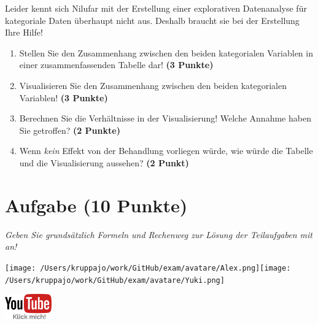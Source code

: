 \documentclass[a4paper, 9pt]{scrartcl}\usepackage[]{graphicx}\usepackage[]{xcolor}
\begin{document}
\vspace{2Ex}

Leider kennt sich Nilufar mit der Erstellung einer explorativen Datenanalyse für kategoriale Daten überhaupt nicht aus. Deshalb braucht sie bei der Erstellung Ihre Hilfe!

\begin{enumerate}
\item Stellen Sie den Zusammenhang zwischen den beiden kategorialen Variablen in einer zusammenfassenden Tabelle dar! \textbf{(3 Punkte)}
\item Visualisieren Sie den Zusammenhang zwischen den beiden kategorialen Variablen! \textbf{(3 Punkte)}
\item Berechnen Sie die Verhältnisse in der Visualisierung! Welche Annahme haben Sie getroffen? \textbf{(2 Punkte)}
\item Wenn \textit{kein} Effekt von der Behandlung vorliegen würde, wie würde die Tabelle und die Visualisierung aussehen? \textbf{(2 Punkt)}
\end{enumerate} 
\clearpage

\section{Aufgabe \hfill (10 Punkte)}

\textit{Geben Sie grundsätzlich Formeln und Rechenweg zur Lösung der Teilaufgaben mit an!} \\[1Ex]
 

 
\begin{minipage}[t]{0.5\textwidth}
\texttt{[image: /Users/kruppajo/work/GitHub/exam/avatare/Alex.png]}\hspace{-4mm}\texttt{[image: /Users/kruppajo/work/GitHub/exam/avatare/Yuki.png]}
\end{minipage}
\begin{minipage}[t]{0.5\textwidth}
\hfill
\href{https://youtu.be/Op-gjzASH9I}{\includegraphics[width = 2cm]{img/youtube}}
\end{minipage}
\end{document}
